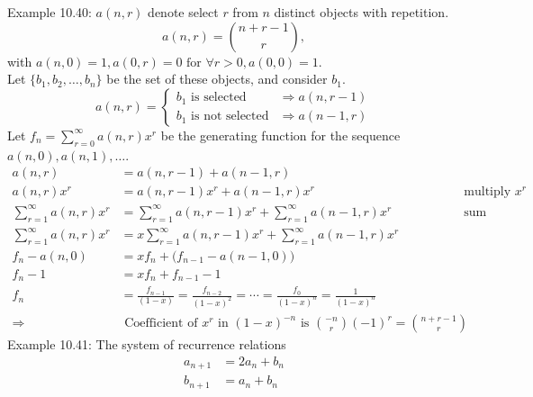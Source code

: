 \documentclass[a4paper]{article}
\begin{document}
Example 10.40: $a(n,r)$ denote select $r$ from $n$ distinct objects with repetition.
\begin{equation*}
a(n,r)=\binom{n+r-1}{r},
\end{equation*}
with $a(n,0)=1,a(0,r)=0\text{ for }\forall{r>0},a(0,0)=1$.\\
Let $\{b_{1},b_{2},\ldots,b_{n}\}$ be the set of these objects, and consider $b_1$.
\begin{equation*}
a(n,r)=
\begin{cases}
b_1\text{ is selected}&\Rightarrow a(n,r-1)\\
b_1\text{ is not selected}&\Rightarrow a(n-1,r)
\end{cases}
\end{equation*}
Let $f_n=\sum_{r=0}^{\infty}{a(n,r)x^r}$ be the generating function for the sequence $a(n,0),a(n,1),\ldots$.
\begin{align*}
    a(n,r)&=a(n,r-1)+ a(n-1,r)\\
    a(n,r)x^r&=a(n,r-1)x^r+ a(n-1,r)x^r&\text{multiply } x^r\\
    \sum_{r=1}^{\infty}{a(n,r)x^r}&=\sum_{r=1}^{\infty}{a(n,r-1)x^r}+ \sum_{r=1}^{\infty}{a(n-1,r)x^r}&\text{sum}\\
    \sum_{r=1}^{\infty}{a(n,r)x^r}&=x\sum_{r=1}^{\infty}{a(n,r-1)x^{r}}+ \sum_{r=1}^{\infty}{a(n-1,r)x^r}\\
    f_n-a(n,0)&=xf_n+\big(f_{n-1}-a(n-1,0)\big)\\
    f_n-1&=xf_n+f_{n-1}-1\\
    f_n&=\frac{f_{n-1}}{(1-x)}=\frac{f_{n-2}}{(1-x)^2}=\cdots=\frac{f_0}{(1-x)^n}=\frac{1}{(1-x)^n}\\
    \Rightarrow &\text{ Coefficient of }x^r\text{ in $(1-x)^{-n}$ is }\binom{-n}{r}(-1)^r=\binom{n+r-1}{r}
\end{align*}
Example 10.41: The system of recurrence relations
\begin{align}
    a_{n+1}&=2a_n+b_n\\
    b_{n+1}&=a_n+b_n
\end{align}
\end{document}
